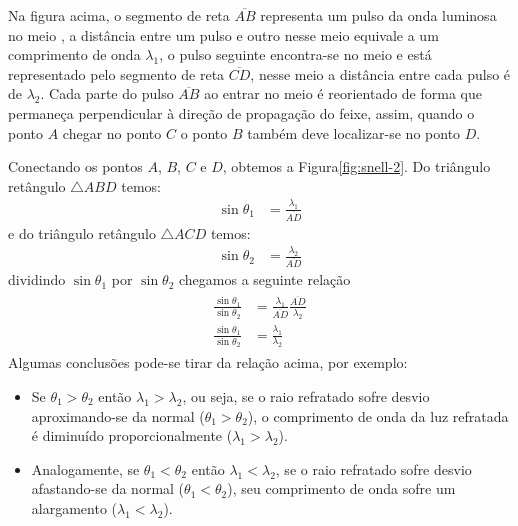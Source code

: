   Na figura acima, o segmento de reta $\overline{AB}$ representa um pulso da onda luminosa no meio , a distância entre um pulso e outro nesse meio equivale a um comprimento de onda $\lambda_1$, o pulso seguinte encontra-se no meio  e está representado pelo segmento de reta $\overline{CD}$, nesse meio a distância entre cada pulso é de $\lambda_2$. Cada parte do pulso $\overline{AB}$ ao entrar no meio  é reorientado de forma que permaneça perpendicular à direção de propagação do feixe, assim, quando o ponto $A$ chegar no ponto $C$ o ponto $B$ também deve localizar-se no ponto $D$.

  Conectando os pontos $A$, $B$, $C$ e $D$, obtemos a Figura\autoref{fig:snell-2}. Do triângulo retângulo $\triangle ABD$ temos:
  \begin{align}
    \sin\theta_1&=\frac{\lambda_1}{\overline{AD}}
  \end{align}
  e do triângulo retângulo $\triangle ACD$ temos:
  \begin{align}
    \sin\theta_2&=\frac{\lambda_2}{\overline{AD}}
  \end{align}
  dividindo $\sin\theta_1$ por $\sin\theta_2$ chegamos a seguinte relação
  \begin{align}
    \begin{split}
        \frac{\sin\theta_1}{\sin\theta_2}&=\frac{\lambda_1}{\overline{AD}}\frac{\overline{AD}}{\lambda_2}\\
        \frac{\sin\theta_1}{\sin\theta_2}&=\frac{\lambda_1}{\lambda_2}
    \end{split}
  \end{align}
Algumas conclusões pode-se tirar da relação acima, por exemplo:
\begin{itemize}
    \item Se $\theta_1>\theta_2$ então $\lambda_1>\lambda_2$, ou seja, se o raio refratado sofre desvio aproximando-se da normal ($\theta_1>\theta_2$), o comprimento de onda da luz refratada é diminuído proporcionalmente ($\lambda_1>\lambda_2$).
    \item Analogamente, se $\theta_1<\theta_2$ então $\lambda_1<\lambda_2$, se o raio refratado sofre desvio afastando-se da normal ($\theta_1<\theta_2$), seu comprimento de onda sofre um alargamento ($\lambda_1<\lambda_2$). 
\end{itemize}


